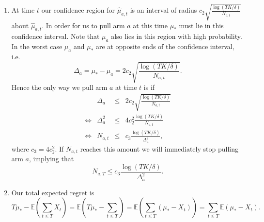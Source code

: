 \documentclass{article}
\newcommand{\E}[1]{\mathbb{E}\left(#1\right)}
\begin{document}
\begin{enumerate}
	\item At time $t$ our confidence region for $\hat \mu_{a,t}$ is an interval of radius $c_2\sqrt{\tfrac{\log(TK/\delta)}{N_{a,t}}}$ about $\hat \mu_{a,t}$. In order for us to pull arm $a$ at this time $\mu_*$ must lie in this confidence interval. Note that $\mu_a$ also lies in this region with high probability. In the worst case $\mu_a$ and $\mu_*$ are at opposite ends of the confidence interval, i.e.
	\begin{equation}
		\Delta_a=\mu_*-\mu_a = 2c_2\sqrt{\frac{\log(TK/\delta)}{N_{a,t}}}.
	\end{equation}
	Hence the only way we pull arm $a$ at time $t$ is if
	\begin{equation}
		\begin{array}{crcl}
			&\Delta_a &\leq& 2c_2\sqrt{\frac{\log(TK/\delta)}{N_{a,t}}}\\
			\iff& \Delta_a^2 &\leq& 4c_2^2\frac{\log(TK/\delta)}{N_{a,t}}\\
			\iff & N_{a,t} &\leq& c_3\frac{\log(TK/\delta)}{\Delta_a^2},
		\end{array}
	\end{equation}
	where $c_3=4c_2^2$. If $N_{a,t}$ reaches this amount we will immediately stop pulling arm $a$, implying that
	\begin{equation}
		N_{a,T}\leq c_3\frac{\log(TK/\delta)}{\Delta_a^2}.
	\end{equation}

	\item Our total expected regret is
	\begin{equation}
		T\mu_*-\E{\sum_{t\leq T}X_t} = \E{T\mu_*-\sum_{t\leq T}} = \E{\sum_{t\leq T}(\mu_*-X_t)}=\sum_{t\leq T}\E{\mu_*-X_t}.
	\end{equation}


\end{enumerate}
\end{document}

